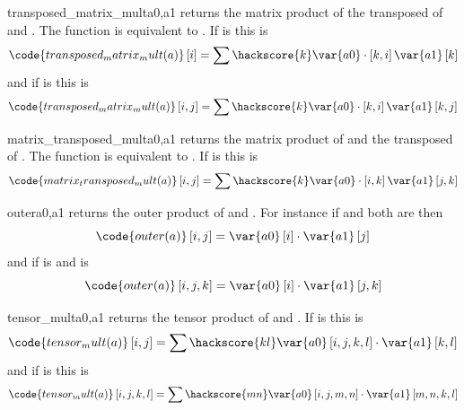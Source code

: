 \begin{funcdesc}{transposed_matrix_mult}{a0,a1}
returns the matrix product of the transposed of  and . The function is equivalent to 
.
If  is \RankOne this is
\begin{equation}
\code{transposed_matrix_mult(a)}\left[i\right]=\sum\hackscore{k}\var{a0}  \cdot \left[k,i\right]\var{a1} \left[k\right]
\end{equation} 
and if  is \RankTwo this is
\begin{equation}
\code{transposed_matrix_mult(a)}\left[i,j\right]=\sum\hackscore{k}\var{a0}  \cdot \left[k,i\right]\var{a1} \left[k,j\right]
\end{equation} 
\end{funcdesc}

\begin{funcdesc}{matrix_transposed_mult}{a0,a1}
returns the matrix product of  and the transposed of .
The function is equivalent to
.  
If  is \RankTwo this is
\begin{equation}
\code{matrix_transposed_mult(a)}\left[i,j\right]=\sum\hackscore{k}\var{a0}  \cdot \left[i,k\right]\var{a1} \left[j,k\right]
\end{equation} 
\end{funcdesc}

\begin{funcdesc}{outer}{a0,a1}
returns the outer product of  and . For instance if  and  both are \RankOne then
\begin{equation}
\code{outer(a)}\left[i,j\right]=\var{a0} \left[i\right]  \cdot  \var{a1}\left[j\right]
\end{equation} 
and if  is \RankOne and  is \RankThree
\begin{equation}
\code{outer(a)}\left[i,j,k\right]=\var{a0} \left[i\right] \cdot \var{a1}\left[j,k\right]
\end{equation} 
\end{funcdesc}

\begin{funcdesc}{tensor_mult}{a0,a1}
returns the tensor product of  and . If  is \RankTwo this is
\begin{equation}
\code{tensor_mult(a)}\left[i,j\right]=\sum\hackscore{kl}\var{a0}\left[i,j,k,l\right] \cdot \var{a1} \left[k,l\right]
\end{equation} 
and if  is \RankFour this is
\begin{equation}
\code{tensor_mult(a)}\left[i,j,k,l\right]=\sum\hackscore{mn}\var{a0} \left[i,j,m,n\right] \cdot \var{a1} \left[m,n,k,l\right]
\end{equation} 
\end{funcdesc}

